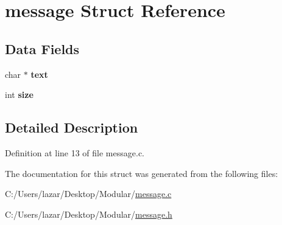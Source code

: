 \hypertarget{structmessage}{}\section{message Struct Reference}
\label{structmessage}
\subsection*{Data Fields}
\begin{DoxyCompactItemize}
\item 
\mbox{\label{structmessage_a479fffc6c8db2b437b1cca3c819f6079}} 
char $\ast$ {\bfseries text}
\item 
\mbox{\label{structmessage_a439227feff9d7f55384e8780cfc2eb82}} 
int {\bfseries size}
\end{DoxyCompactItemize}


\subsection{Detailed Description}


Definition at line 13 of file message.\+c.



The documentation for this struct was generated from the following files\+:\begin{DoxyCompactItemize}
\item 
C\+:/\+Users/lazar/\+Desktop/\+Modular/\mbox{\hyperlink{message_8c}{message.\+c}}\item 
C\+:/\+Users/lazar/\+Desktop/\+Modular/\mbox{\hyperlink{message_8h}{message.\+h}}\end{DoxyCompactItemize}
